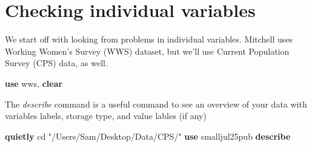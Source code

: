 \documentclass[
]{book}
\newenvironment{Shaded}{\begin{snugshade}}{\end{snugshade}}
\newcommand{\KeywordTok}[1]{\textcolor[rgb]{0.13,0.29,0.53}{\textbf{#1}}}
\newcommand{\NormalTok}[1]{#1}
\newcommand{\StringTok}[1]{\textcolor[rgb]{0.31,0.60,0.02}{#1}}
\begin{document}
\section{Checking individual variables}\label{checking-individual-variables}

We start off with looking from problems in individual variables. Mitchell uses Working Women's Survey (WWS) dataset, but we'll use Current Population Survey (CPS) data, as well.

\begin{Shaded}
\begin{Highlighting}[]
\KeywordTok{use}\NormalTok{ wws, }\KeywordTok{clear}
\end{Highlighting}
\end{Shaded}

The \emph{describe} command is a useful command to see an overview of your data
with variables labels, storage type, and value lables (if any)

\begin{Shaded}
\begin{Highlighting}[]
\KeywordTok{quietly}\NormalTok{ cd }\StringTok{"/Users/Sam/Desktop/Data/CPS/"}
\KeywordTok{use}\NormalTok{ smalljul25pub}
\KeywordTok{describe}
\end{Highlighting}
\end{Shaded}
\end{document}
